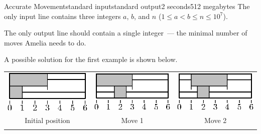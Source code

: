 \begin{problem}{Accurate Movement}{standard input}{standard output}{2 seconds}{512 megabytes}
\InputFile
The only input line contains three integers $a$, $b$, and $n$ ($1 \le a < b \le n \le 10^7$). 

\OutputFile
The only output line should contain a single integer~--- the minimal number of moves Amelia needs to do. 

\Examples

\begin{example}
%
%
\end{example}

\Note
A possible solution for the first example is shown below.

\begin{center}
\begin{tabular}{ccc}
\includegraphics{bars-2.ps} & \includegraphics{bars-4.ps} & \includegraphics{bars-5.ps} \\
Initial position            & Move 1                      & Move 2\\
&&\\

\end{tabular}
\end{center}
\end{problem}
